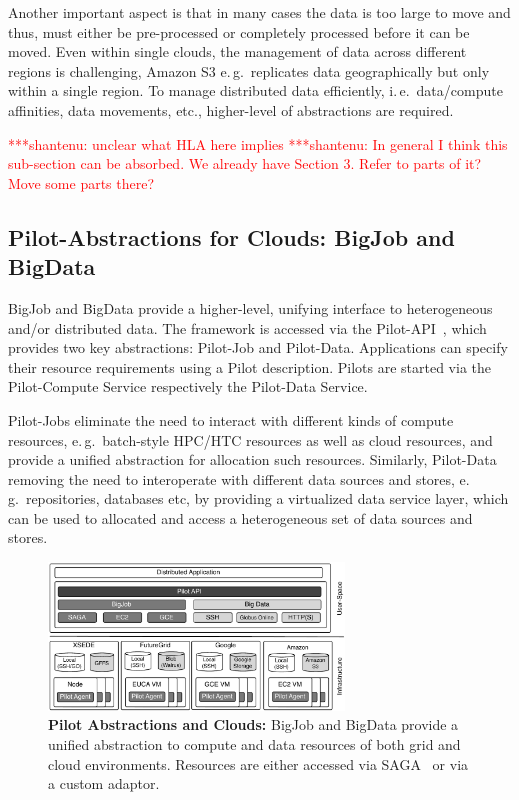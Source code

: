 \documentclass[times]{cpeauth}
\newcommand{\jhanote}[1]{ {\textcolor{red} { ***shantenu: #1 }}}
\newcommand{\jhanote}[1]{}
\newcommand{\pilot}{Pilot\xspace}
\newcommand{\pilots}{Pilots\xspace}
\newcommand{\pilotjob}{Pilot-Job\xspace}
\newcommand{\pilotjobs}{Pilot-Jobs\xspace}
\newcommand{\pilotdata}{Pilot-Data\xspace}
\newcommand{\pilotdataservice}{Pilot-Data Service\xspace}
\newcommand{\pilotcomputeservice}{Pilot-Compute Service\xspace}
\begin{document}
Another important aspect is that in many cases the data is too large
to move and thus, must either be pre-processed or completely processed
before it can be moved. Even within single clouds, the management of
data across different regions is challenging, Amazon S3
e.\,g.\ replicates data geographically but only within a single
region. To manage distributed data efficiently, i.\,e.\ data/compute
affinities, data movements, etc., higher-level of abstractions are
required. 

\jhanote{unclear what HLA here implies} \jhanote{In general I think
  this sub-section can be absorbed. We already have Section 3. Refer
  to parts of it? Move some parts there?}

\subsection{Pilot-Abstractions for Clouds: BigJob and BigData}

BigJob and BigData provide a higher-level, unifying interface to heterogeneous
and/or distributed data. The framework is accessed via the
Pilot-API~\cite{pilot_api}, which provides two key abstractions: \pilotjob and
\pilotdata. Applications can specify their resource requirements using a
\pilot description. \pilots are started via the \pilotcomputeservice
respectively the \pilotdataservice.

\pilotjobs eliminate the need to interact with different kinds of compute 
resources, e.\,g.\ batch-style HPC/HTC resources as well as cloud resources, 
and provide a unified abstraction for allocation such resources. Similarly, 
\pilotdata removing the need to interoperate with different data sources and 
stores, e.\,g.\ repositories, databases etc, by providing a virtualized data 
service layer, which can be used to allocated and access a heterogeneous set 
of data sources and stores.

\begin{figure}[t]
	\centering
		\includegraphics[width=0.7\textwidth]{figures/cloud_pilot_job.pdf}
	\caption{\textbf{Pilot Abstractions and Clouds:} BigJob and BigData 
	provide a unified abstraction to compute and data resources of both grid 
	and cloud environments. Resources are either accessed via 
	SAGA~\cite{ogf-gfd-90,saga-bliss-pd} or via a custom adaptor.}
	\label{fig:figures_cloud_pilot_job}
\end{figure}
\end{document}
